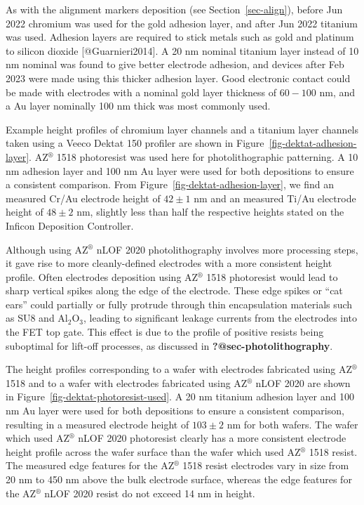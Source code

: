 \documentclass[
  letterpaper,
  DIV=11,
  numbers=noendperiod]{scrartcl}
\begin{document}
As with the alignment markers deposition (see Section~\ref{sec-align}),
before Jun 2022 chromium was used for the gold adhesion layer, and after
Jun 2022 titanium was used. Adhesion layers are required to stick metals
such as gold and platinum to silicon dioxide {[}@Guarnieri2014{]}. A 20
nm nominal titanium layer instead of 10 nm nominal was found to give
better electrode adhesion, and devices after Feb 2023 were made using
this thicker adhesion layer. Good electronic contact could be made with
electrodes with a nominal gold layer thickness of \(60-100\) nm, and a
Au layer nominally 100 nm thick was most commonly used.

Example height profiles of chromium layer channels and a titanium layer
channels taken using a Veeco Dektat 150 profiler are shown in
Figure~\ref{fig-dektat-adhesion-layer}. AZ\(^\circledR\) 1518
photoresist was used here for photolithographic patterning. A 10 nm
adhesion layer and 100 nm Au layer were used for both depositions to
ensure a consistent comparison. From
Figure~\ref{fig-dektat-adhesion-layer}, we find an measured Cr/Au
electrode height of \(42\pm1\) nm and an measured Ti/Au electrode height
of \(48\pm2\) nm, slightly less than half the respective heights stated
on the Inficon Deposition Controller.

Although using AZ\(^\circledR\) nLOF 2020 photolithography involves more
processing steps, it gave rise to more cleanly-defined electrodes with a
more consistent height profile. Often electrodes deposition using
AZ\(^\circledR\) 1518 photoresist would lead to sharp vertical spikes
along the edge of the electrode. These edge spikes or ``cat ears'' could
partially or fully protrude through thin encapsulation materials such as
SU8 and Al\(_2\)O\(_3\), leading to significant leakage currents from
the electrodes into the FET top gate. This effect is due to the profile
of positive resists being suboptimal for lift-off processes, as
discussed in \textbf{?@sec-photolithography}.

The height profiles corresponding to a wafer with electrodes fabricated
using AZ\(^\circledR\) 1518 and to a wafer with electrodes fabricated
using AZ\(^\circledR\) nLOF 2020 are shown in
Figure~\ref{fig-dektat-photoresist-used}. A 20 nm titanium adhesion
layer and 100 nm Au layer were used for both depositions to ensure a
consistent comparison, resulting in a measured electrode height of
\(103\pm2\) nm for both wafers. The wafer which used AZ\(^\circledR\)
nLOF 2020 photoresist clearly has a more consistent electrode height
profile across the wafer surface than the wafer which used
AZ\(^\circledR\) 1518 resist. The measured edge features for the
AZ\(^\circledR\) 1518 resist electrodes vary in size from 20 nm to 450
nm above the bulk electrode surface, whereas the edge features for the
AZ\(^\circledR\) nLOF 2020 resist do not exceed 14 nm in height.
\end{document}
